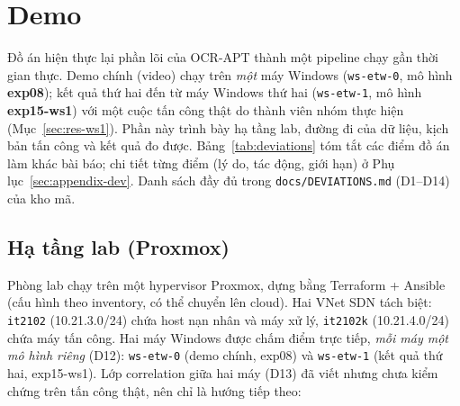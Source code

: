 \section{Demo}
\label{sec:demo}
Đồ án hiện thực lại phần lõi của OCR-APT thành một pipeline chạy gần thời gian thực. Demo chính (video) chạy trên \emph{một} máy Windows (\texttt{ws-etw-0}, mô hình \textbf{exp08}); kết quả thứ hai đến từ máy Windows thứ hai (\texttt{ws-etw-1}, mô hình \textbf{exp15-ws1}) với một cuộc tấn công thật do thành viên nhóm thực hiện (Mục~\ref{sec:res-ws1}). Phần này trình bày hạ tầng lab, đường đi của dữ liệu, kịch bản tấn công và kết quả đo được. Bảng~\ref{tab:deviations} tóm tắt các điểm đồ án làm khác bài báo; chi tiết từng điểm (lý do, tác động, giới hạn) ở Phụ lục~\ref{sec:appendix-dev}. Danh sách đầy đủ trong \texttt{docs/DEVIATIONS.md} (D1--D14) của kho mã.

\subsection{Hạ tầng lab (Proxmox)}
\label{sec:infra}

Phòng lab chạy trên một hypervisor Proxmox, dựng bằng Terraform + Ansible (cấu hình theo inventory, có thể chuyển lên cloud). Hai VNet SDN tách biệt: \texttt{it2102} (10.21.3.0/24) chứa host nạn nhân và máy xử lý, \texttt{it2102k} (10.21.4.0/24) chứa máy tấn công. Hai máy Windows được chấm điểm trực tiếp, \emph{mỗi máy một mô hình riêng} (D12): \texttt{ws-etw-0} (demo chính, exp08) và \texttt{ws-etw-1} (kết quả thứ hai, exp15-ws1). Lớp correlation giữa hai máy (D13) đã viết nhưng chưa kiểm chứng trên tấn công thật, nên chỉ là hướng tiếp theo:

